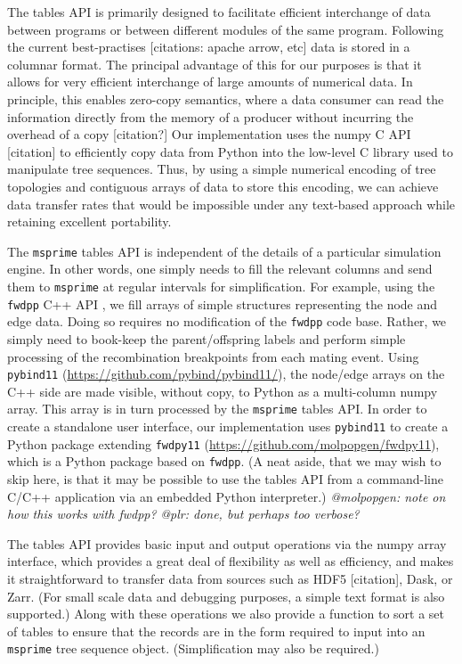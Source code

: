 \documentclass{article}
\newcommand{\fwdpp}{\texttt{fwdpp}}
\newcommand{\msprime}{\texttt{msprime}}
\newcommand{\krt}[1]{{\em \color{green} #1}}
\newcommand{\plr}[1]{{\em \color{blue} #1}}
\begin{document}
The tables API is primarily designed to facilitate efficient interchange of
data between programs or between different modules of the same program.
Following the current best-practises [citations: apache arrow, etc] data is stored
in a columnar format.
The principal advantage of this for our purposes is that it allows for very efficient
interchange of large amounts of numerical data. In principle, this enables
zero-copy semantics, where a data consumer can read the information directly
from the memory of a producer without incurring the overhead of a copy
[citation?] Our implementation uses the numpy C API [citation] to efficiently copy
data from Python into the low-level C library used to manipulate
tree sequences.
Thus, by using a simple numerical
encoding of tree topologies and contiguous arrays of data to store this
encoding, we can achieve data transfer rates that would be impossible under
any text-based approach while retaining excellent portability.


The \msprime{} tables API is independent of the details of a particular simulation engine.  In other words, one simply
needs to fill the relevant columns and send them to \msprime{} at regular intervals for simplification.  For example,
using the \fwdpp{} C++ API \cite{Thornton2014-hx}, we fill arrays of simple structures representing the node and edge data.
Doing so requires no modification of the \fwdpp{} code base.  Rather, we simply need to book-keep the parent/offspring
labels and perform simple processing of the recombination breakpoints from each mating event.  Using \texttt{pybind11}
(\url{https://github.com/pybind/pybind11/}),
the node/edge arrays on
the C++ side are made visible, without copy, to Python as a multi-column numpy array. This array is in turn processed by
the \msprime{} tables API.  In order to create a standalone user interface, our implementation uses \texttt{pybind11} to
create a Python package extending \texttt{fwdpy11} (\url{https://github.com/molpopgen/fwdpy11}), which is a Python
package based on \fwdpp{}.  (A neat aside, that we may wish to skip here, is that it may be possible to use the tables
API from a command-line C/C++ application via an embedded Python interpreter.)
\plr{@molpopgen: note on how this works with fwdpp?}
\krt{@plr: done, but perhaps too verbose?}

The tables API provides basic input and output operations via the numpy
array interface, which provides a great deal of flexibility as well
as efficiency, and makes it straightforward to transfer data from sources
such as HDF5 [citation], Dask, or Zarr. 
(For small scale data and debugging purposes, a simple text format is also supported.)
Along with these operations we also provide a function to sort a set of tables
to ensure that the records are in the form required to input
into an \msprime{} tree sequence object. (Simplification may also be required.)
\end{document}
